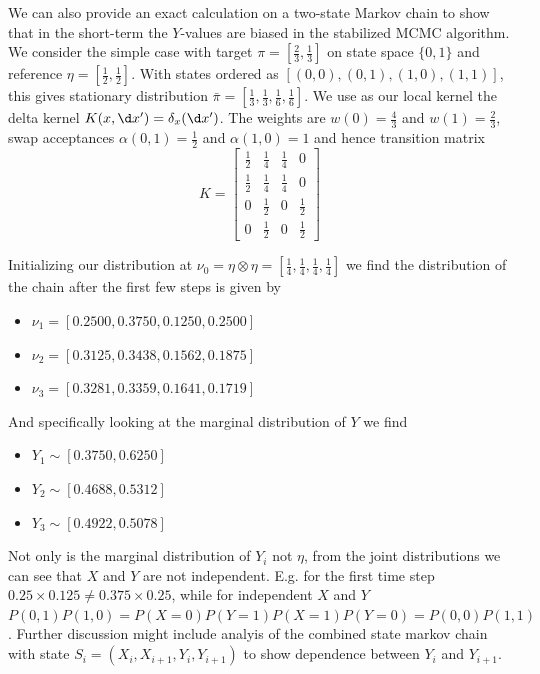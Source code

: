 \documentclass{article}
\begin{document}
\begin{enumerate}
    We can also provide an exact calculation on a two-state Markov chain to
    show that in the short-term the $Y$-values are biased in the stabilized MCMC
    algorithm. We consider the simple case with target $\pi = [\frac 2 3, \frac 1 3]$ on
    state space $\{0,1\}$ and reference $\eta = 
    \left[\frac 1 2, \frac 1 2 \right]$. With states
    ordered as $[(0,0), (0,1), (1,0), (1,1)]$, this gives
    stationary distribution
    $\bar \pi = \left[\frac 1 3, \frac 1 3, \frac 1 6, \frac 1 6 \right]$. We use as our local kernel the
    delta kernel $K(x, \d x') = \delta_x(\d x')$. The
    weights are $w(0) = \frac 4 3 $ and $w(1) = \frac 2 3 $, swap acceptances 
    $\alpha(0,1) = \frac 1 2$ and $\alpha(1,0) = 1$ and hence transition matrix
    \[ K = \begin{bmatrix}
        \frac 1 2 & \frac 1 4 & \frac 1 4 & 0 \\
        \frac 1 2 & \frac 1 4 & \frac 1 4 & 0 \\
        0 & \frac 1 2 & 0 & \frac 1 2 \\ 
        0 & \frac 1 2 & 0 & \frac 1 2
    \end{bmatrix} \]
    
    Initializing our distribution at $\nu_0 = \eta \otimes \eta = 
    \left[\frac 1 4, \frac 1 4, \frac 1 4, \frac 1 4\right]$ we find the distribution of the chain after the first
    few steps is given by 
    \begin{itemize}
        \item $\nu_1 =  [0.2500, 0.3750, 0.1250, 0.2500]$
        \item $\nu_2 = [0.3125, 0.3438, 0.1562, 0.1875]$
        \item $\nu_3 = [0.3281, 0.3359, 0.1641, 0.1719]$
    \end{itemize}
    And specifically looking at the marginal distribution of $Y$ we find
    \begin{itemize}
        \item $Y_1 \sim [0.3750, 0.6250]$
        \item $Y_2 \sim [0.4688, 0.5312]$
        \item $Y_3 \sim [0.4922, 0.5078]$
    \end{itemize}
    Not only is the marginal distribution of $Y_i$ not $\eta$, from the joint
    distributions we can see that $X$ and $Y$ are not independent. E.g. for the 
    first time step $0.25 \times 0.125 \neq 0.375 \times 0.25$, while for
    independent $X$ and $Y$
    $P(0,1)P(1,0)=P(X=0)P(Y=1)P(X=1)P(Y=0)=P(0,0)P(1,1)$.
    Further discussion might include analyis of the combined state markov chain
    with state $S_i = (X_i, X_{i+1}, Y_i, Y_{i+1})$ to show dependence between
    $Y_i$ and $Y_{i+1}$.


\end{enumerate}
\end{document}
